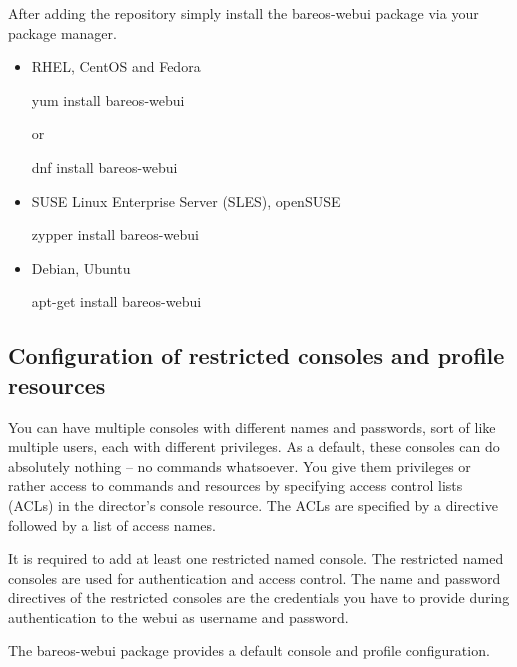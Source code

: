After adding the repository simply install the bareos-webui package via your package manager.

\begin{itemize}
 \item RHEL, CentOS and Fedora
\begin{commands}{}
yum install bareos-webui
\end{commands}
 or
\begin{commands}{}
dnf install bareos-webui
\end{commands}
\end{itemize}

\begin{itemize}
 \item SUSE Linux Enterprise Server (SLES), openSUSE
\begin{commands}{}
zypper install bareos-webui
\end{commands}
\end{itemize}

\begin{itemize}
 \item Debian, Ubuntu
\begin{commands}{}
apt-get install bareos-webui
\end{commands}
\end{itemize}

\subsection{Configuration of restricted consoles and profile resources}

You can have multiple consoles with different names and passwords, sort of like multiple users, each with different privileges. As a default, these consoles can do absolutely nothing – no commands whatsoever. You give them privileges or rather access to commands and resources by specifying access control lists (ACLs) in the director’s console resource. The ACLs are specified by a directive followed by a list of access names.

It is required to add at least one restricted named console. The restricted named consoles are used for authentication and access control. The name and password directives of the restricted consoles are the credentials you have to provide during authentication to the webui as username and password.

The bareos-webui package provides a default console and profile configuration.


